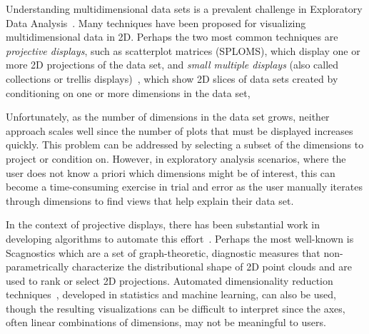 

Understanding multidimensional data sets is a prevalent challenge in Exploratory Data Analysis~\cite{Tukey1977}. Many techniques have been proposed for visualizing multidimensional data in 2D. Perhaps the two most common techniques are
\emph{projective displays}, such as scatterplot matrices (SPLOMS), which display one or more 2D projections of the data set,
and \emph{small multiple displays} (also called collections or trellis displays)~\cite{Bertin1983, tufte1986, Becker1996}, which show 2D slices of data sets created by conditioning on one or more dimensions in the data set,

Unfortunately, as the number of dimensions in the data set grows, neither approach scales well since the number of plots that must be displayed increases quickly. This problem can be addressed by selecting a subset of the dimensions to project or condition on. However, in exploratory analysis scenarios, where the user does not know a priori which dimensions might be of interest, this can become a time-consuming exercise in trial and error as the user manually iterates through dimensions to find views that help explain their data set. 

In the context of projective displays, there has been substantial work in developing algorithms to automate this effort~\cite{Seo2005,Wilkinson2005,Sips2009}. Perhaps the most well-known is Scagnostics which are a set of graph-theoretic, diagnostic measures that non-parametrically characterize the distributional shape of 2D point clouds and are used to rank or select 2D projections. Automated dimensionality reduction techniques~\cite{Friedman1974,Yang2003,Sedlmair2013}, developed in statistics and machine learning, can also be used, though the resulting visualizations can be difficult to interpret since the axes, often linear combinations of dimensions, may not be meaningful to users.

